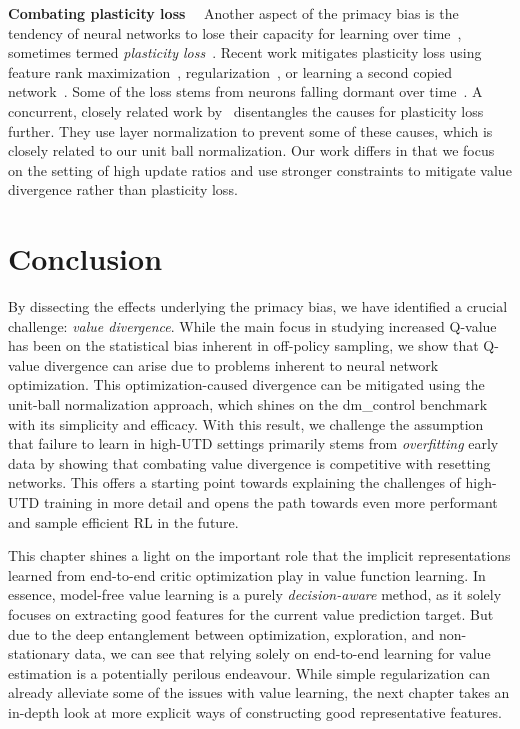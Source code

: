 {\bf Combating plasticity loss}~~ Another aspect of the primacy bias is the tendency of neural networks to lose their capacity for learning over time~\parencite{igl2021transient}, sometimes termed \emph{plasticity loss}~\parencite{lyle2022understanding, abbas2023loss}. Recent work mitigates plasticity loss using feature rank maximization~\parencite{kumar2021implicit}, regularization~\parencite{lyle2023understanding}, or learning a second copied network~\parencite{nikishin2024deep}. Some of the loss stems from neurons falling dormant over time~\parencite{sokar2023dormant}. A concurrent, closely related work by~\textcite{lyle2024disentangling} disentangles the causes for plasticity loss further. They use layer normalization to prevent some of these causes, which is closely related to our unit ball normalization. Our work differs in that we focus on the setting of high update ratios and use stronger constraints to mitigate value divergence rather than plasticity loss. 


\section{Conclusion}

By dissecting the effects underlying the primacy bias, we have identified a crucial challenge: \emph{value divergence}. 
While the main focus in studying increased Q-value has been on the statistical bias inherent in off-policy sampling, we show that Q-value divergence can arise due to problems inherent to neural network optimization.
This optimization-caused divergence can be mitigated using the unit-ball normalization approach, which shines on the \textsf{dm\_control} benchmark with its simplicity and efficacy. 
With this result, we challenge the assumption that failure to learn in high-UTD settings primarily stems from \emph{overfitting} early data by showing that combating value divergence is competitive with resetting networks. 
This offers a starting point towards explaining the challenges of high-UTD training in more detail and opens the path towards even more performant and sample efficient RL in the future.

This chapter shines a light on the important role that the implicit representations learned from end-to-end critic optimization play in value function learning.
In essence, model-free value learning is a purely \emph{decision-aware} method, as it solely focuses on extracting good features for the current value prediction target.
But due to the deep entanglement between optimization, exploration, and non-stationary data, we can see that relying solely on end-to-end learning for value estimation is a potentially perilous endeavour.
While simple regularization can already alleviate some of the issues with value learning,  the next chapter takes an in-depth look at more explicit ways of constructing good representative features.
